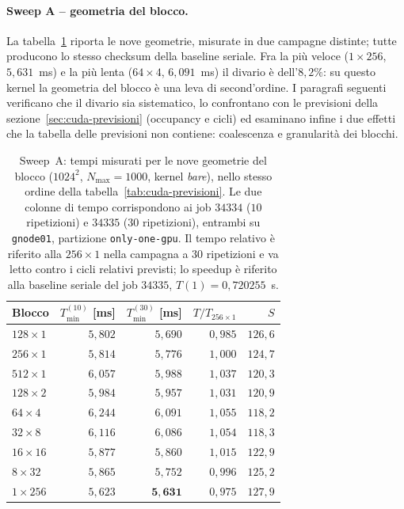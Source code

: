 \paragraph{Sweep A -- geometria del blocco.}
La tabella~\ref{tab:cuda-blocks} riporta le nove geometrie, misurate in due
campagne distinte; tutte producono lo stesso checksum della baseline seriale.
Fra la più veloce ($1{\times}256$, $5{,}631$~ms) e la più lenta ($64{\times}4$,
$6{,}091$~ms) il divario è dell'$8{,}2\%$: su questo kernel la geometria del
blocco è una leva di second'ordine. I paragrafi seguenti verificano che il
divario sia sistematico, lo confrontano con le previsioni della
sezione~\ref{sec:cuda-previsioni} (occupancy e cicli) ed esaminano infine i due
effetti che la tabella delle previsioni non contiene: coalescenza e granularità
dei blocchi.
\vspace{2,5mm}
\begin{table}[htbp]
    \centering
    \caption{Sweep~A: tempi misurati per le nove geometrie del blocco ($1024^2$,
        $N_{\max}=1000$, kernel \emph{bare}), nello stesso ordine della
        tabella~\ref{tab:cuda-previsioni}. Le due colonne di tempo corrispondono ai
        job $34334$ ($10$ ripetizioni) e $34335$ ($30$ ripetizioni), entrambi su
        \texttt{gnode01}, partizione \texttt{only-one-gpu}. Il tempo relativo è
        riferito alla $256{\times}1$ nella campagna a $30$ ripetizioni e va letto
        contro i cicli relativi previsti; lo speedup è riferito alla baseline
        seriale del job $34335$, $T(1) = 0{,}720255$~s.}
    \label{tab:cuda-blocks}
    \begin{tabular}{lrrrr}
        \hline
        Blocco & $T_{\min}^{(10)}$ [ms] & $T_{\min}^{(30)}$ [ms] & $T/T_{256\times1}$ & $S$ \\
        \hline
        $128{\times}1$ & $5{,}802$ & $5{,}690$ & $0{,}985$ & $126{,}6$ \\
        $256{\times}1$ & $5{,}814$ & $5{,}776$ & $1{,}000$ & $124{,}7$ \\
        $512{\times}1$ & $6{,}057$ & $5{,}988$ & $1{,}037$ & $120{,}3$ \\
        $128{\times}2$ & $5{,}984$ & $5{,}957$ & $1{,}031$ & $120{,}9$ \\
        $64{\times}4$  & $6{,}244$ & $6{,}091$ & $1{,}055$ & $118{,}2$ \\
        $32{\times}8$  & $6{,}116$ & $6{,}086$ & $1{,}054$ & $118{,}3$ \\
        \hline
        $16{\times}16$ & $5{,}877$ & $5{,}860$ & $1{,}015$ & $122{,}9$ \\
        $8{\times}32$  & $5{,}865$ & $5{,}752$ & $0{,}996$ & $125{,}2$ \\
        \hline
        $1{\times}256$ & $5{,}623$ & $\mathbf{5{,}631}$ & $0{,}975$ & $127{,}9$ \\
        \hline
    \end{tabular}
\end{table}

